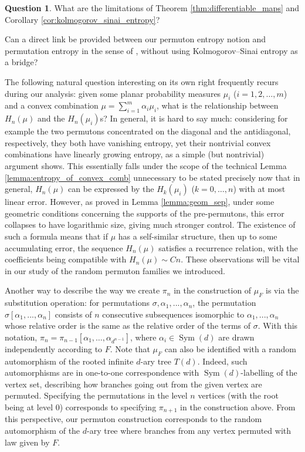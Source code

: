 \documentclass[11pt]{article}
\newcommand{\Sym}{\mathop{\mathrm{Sym}}}
\theoremstyle{definition}
\newtheorem{quest}[theorem]{Question}
\begin{document}
\begin{quest}
    What are the limitations of Theorem \ref{thm:differentiable_maps} and Corollary \ref{cor:kolmogorov_sinai_entropy}? 

    Can a direct link be provided between our permuton entropy notion and permutation entropy in the sense of \cite{BandtKellerPompe}, without using Kolmogorov--Sinai entropy as a bridge?
\end{quest}

The following natural question interesting on its own right frequently recurs during our analysis: given some planar probability measures $\mu_i$ ($i=1, 2, \dots, m$) and a convex combination $\mu=\sum_{i=1}^{m}\alpha_i\mu_i$, what is the relationship between $H_n(\mu)$ and the $H_n(\mu_i)$s? In general, it is hard to say much: considering for example the two permutons concentrated on the diagonal and the antidiagonal, respectively, they both have vanishing entropy, yet their nontrivial convex combinations have linearly growing entropy, as a simple (but nontrivial) argument shows. This essentially falls under the scope of the technical Lemma \ref{lemma:entropy_of_convex_comb} unnecessary to be stated precisely now that in general, $H_n(\mu)$ can be expressed by the $H_k(\mu_i)$ ($k=0, \dots, n$) with at most linear error. However, as proved in Lemma \ref{lemma:geom_sep}, under some geometric conditions concerning the supports of the pre-permutons, this error collapses to have logarithmic size, giving much stronger control. The existence of such a formula means that if $\mu$ has a self-similar structure, then up to some accumulating error, the sequence $H_n(\mu)$ satisfies a recurrence relation, with the coefficients being compatible with $H_n(\mu)\sim Cn$. These observations will be vital in our study of the random permuton families we introduced.

Another way to describe the way we create $\pi_n$ in the construction of $\mu_F$ is via the substitution operation: for permutations $\sigma, \alpha_1, ..., \alpha_n$, the permutation $\sigma[\alpha_1, ..., \alpha_n]$ consists of $n$ consecutive subsequences isomorphic to $\alpha_1, ..., \alpha_n$ whose relative order is the same as the relative order of the terms of $\sigma$. With this notation, $\pi_n=\pi_{n-1}[\alpha_1, \dots, \alpha_{d^{n-1}}]$, where $\alpha_i\in \Sym(d)$ are drawn independently according to $F$. Note that $\mu_F$ can also be identified with a random automorphism of the rooted infinite $d$-ary tree $T(d)$. Indeed, such automorphisms are in one-to-one correspondence with $\Sym(d)$-labelling of the vertex set, describing how branches going out from the given vertex are permuted. Specifying the permutations in the level $n$ vertices (with the root being at level 0) corresponds to specifying $\pi_{n+1}$ in the construction above. From this perspective, our permuton construction corresponds to the random automorphism of the $d$-ary tree where branches from any vertex permuted with law given by $F$.
\end{document}

